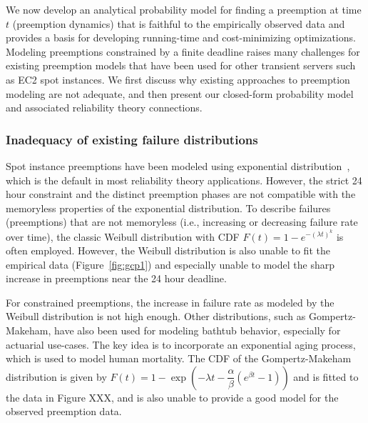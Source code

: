 We now develop an analytical probability model for finding a preemption at time $t$ (preemption dynamics) that is faithful to the empirically observed data and provides a basis for developing running-time and cost-minimizing optimizations. %
Modeling preemptions constrained by a finite deadline raises many challenges for existing preemption models that have been used for other transient servers such as EC2 spot instances. 
We first discuss why existing approaches to preemption modeling are not adequate, and then present our closed-form probability model and associated reliability theory connections. 


\subsubsection{Inadequacy of existing failure distributions}

Spot instance preemptions have been modeled using exponential distribution~\cite{sigcomm-bidcloud, hotcloud-notbid, flint}, which is the default in most reliability theory applications. 
However, the strict 24 hour constraint and the distinct preemption phases are not compatible with the memoryless properties of the exponential distribution. 
%
To describe failures (preemptions) that are not memoryless (i.e., increasing or decreasing failure rate over time), the classic Weibull distribution with CDF $F(t)=1-e^{-(\lambda t)^k}$ is often employed. However, the Weibull distribution is also unable to fit the empirical data (Figure~\ref{fig:gcp1}) and especially unable to model the sharp increase in preemptions near the 24 hour deadline. 

For constrained preemptions, the increase in failure rate as modeled by the Weibull distribution is not high enough.
Other distributions, such as Gompertz-Makeham, have also been used for modeling bathtub behavior, especially  for actuarial use-cases.
The key idea is to incorporate an exponential aging process, which is used to model human mortality.
The CDF of the Gompertz-Makeham distribution is given by $F(t) = 1 - \exp\left(-\lambda t - \dfrac{\alpha}{\beta}(e^{\beta t} - 1) \right)$
  and is fitted to the data in Figure XXX, and is also unable to provide a good model for the observed preemption data. 



